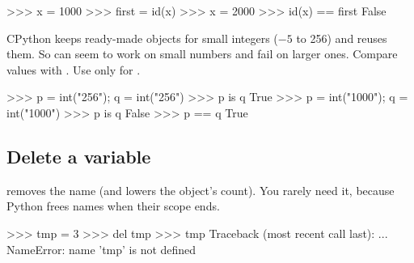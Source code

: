 \begin{center}
\end{center}

\begin{pycode}
>>> x = 1000
>>> first = id(x)
>>> x = 2000
>>> id(x) == first
False
\end{pycode}

\begin{trap}
CPython keeps ready-made objects for small integers ($-5$ to 256) and reuses them. So
 can seem to work on small numbers and fail on larger ones. Compare values with \code{==}.
Use  only for .
\begin{pycode}
>>> p = int("256"); q = int("256")
>>> p is q
True
>>> p = int("1000"); q = int("1000")
>>> p is q
False
>>> p == q
True
\end{pycode}
\end{trap}

\subsection{Delete a variable}

 removes the name (and lowers the object's count). You rarely need it, because
Python frees names when their scope ends.

\begin{pycode}
>>> tmp = 3
>>> del tmp
>>> tmp
Traceback (most recent call last):
  ...
NameError: name 'tmp' is not defined
\end{pycode}

